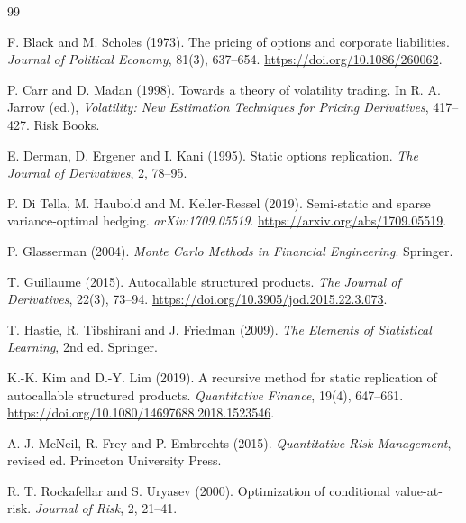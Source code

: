 \documentclass[12pt,a4paper]{article}
\newcommand{\1}{\mathbf{1}}
\begin{document}
\clearpage
{}
{}
\begin{singlespace}
\begin{thebibliography}{99}

F. Black and M. Scholes (1973).
The pricing of options and corporate liabilities.
\emph{Journal of Political Economy}, 81(3), 637--654.
\url{https://doi.org/10.1086/260062}.

P. Carr and D. Madan (1998).
Towards a theory of volatility trading.
In R. A. Jarrow (ed.),
\emph{Volatility: New Estimation Techniques for Pricing Derivatives},
417--427. Risk Books.

E. Derman, D. Ergener and I. Kani (1995).
Static options replication.
\emph{The Journal of Derivatives}, 2, 78--95.

P. Di Tella, M. Haubold and M. Keller-Ressel (2019).
Semi-static and sparse variance-optimal hedging.
\emph{arXiv:1709.05519}.
\url{https://arxiv.org/abs/1709.05519}.

P. Glasserman (2004).
\emph{Monte Carlo Methods in Financial Engineering}.
Springer.

T. Guillaume (2015).
Autocallable structured products.
\emph{The Journal of Derivatives}, 22(3), 73--94.
\url{https://doi.org/10.3905/jod.2015.22.3.073}.

T. Hastie, R. Tibshirani and J. Friedman (2009).
\emph{The Elements of Statistical Learning}, 2nd ed.
Springer.

K.-K. Kim and D.-Y. Lim (2019).
A recursive method for static replication of autocallable structured products.
\emph{Quantitative Finance}, 19(4), 647--661.
\url{https://doi.org/10.1080/14697688.2018.1523546}.

A. J. McNeil, R. Frey and P. Embrechts (2015).
\emph{Quantitative Risk Management}, revised ed.
Princeton University Press.

R. T. Rockafellar and S. Uryasev (2000).
Optimization of conditional value-at-risk.
\emph{Journal of Risk}, 2, 21--41.

\end{thebibliography}
\end{singlespace}
\end{document}

